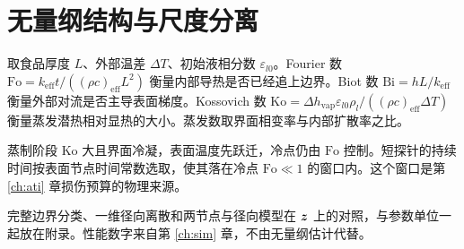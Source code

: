 \section{无量纲结构与尺度分离}

取食品厚度 $L$、外部温差 $\Delta T$、初始液相分数 $\varepsilon_{l0}$。Fourier 数 $\mathrm{Fo}=k_{\mathrm{eff}}t/((\rho c)_{\mathrm{eff}}L^2)$ 衡量内部导热是否已经追上边界。Biot 数 $\mathrm{Bi}=hL/k_{\mathrm{eff}}$ 衡量外部对流是否主导表面梯度。Kossovich 数 $\mathrm{Ko}=\Delta h_{\mathrm{vap}}\varepsilon_{l0}\rho_l/((\rho c)_{\mathrm{eff}}\Delta T)$ 衡量蒸发潜热相对显热的大小。蒸发数取界面相变率与内部扩散率之比。

蒸制阶段 $\mathrm{Ko}$ 大且界面冷凝，表面温度先跃迁，冷点仍由 $\mathrm{Fo}$ 控制。短探针的持续时间按表面节点时间常数选取，使其落在冷点 $\mathrm{Fo}\ll 1$ 的窗口内。这个窗口是第 \ref{ch:ati} 章损伤预算的物理来源。

完整边界分类、一维径向离散和两节点与径向模型在 $\bm{z}$ 上的对照，与参数单位一起放在附录。性能数字来自第 \ref{ch:sim} 章，不由无量纲估计代替。
